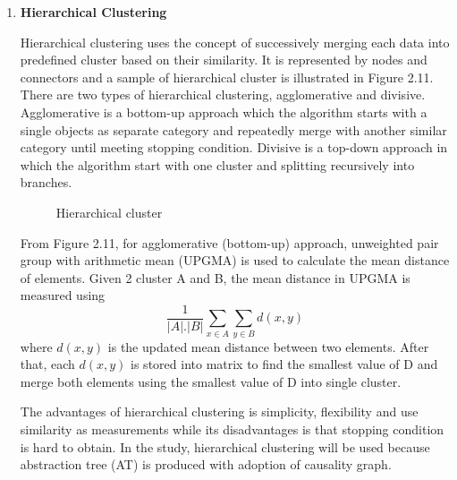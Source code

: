 \documentclass[twoside]{utmthesis}
\begin{document}
\begin{enumerate}
\item \textbf{Hierarchical Clustering}

Hierarchical clustering uses the concept of successively merging each data into predefined cluster based on their similarity. It is represented by nodes and connectors and a sample of hierarchical cluster is illustrated in Figure 2.11. There are two types of hierarchical clustering, agglomerative and divisive. Agglomerative is a bottom-up approach which the algorithm starts with a single objects as separate category and repeatedly merge with another similar category until meeting stopping condition. Divisive is a top-down approach in which the algorithm start with one cluster and splitting recursively into branches.  
\vspace{-1cm}
\begin{figure}[H]
\centering
{}
\caption{Hierarchical cluster \citep{suyal2014text}}
\end{figure}
\vspace{-1cm}
From Figure 2.11, for agglomerative (bottom-up) approach, unweighted pair group with arithmetic mean (UPGMA) is used to calculate the mean distance of elements. Given 2 cluster A and B, the mean distance in UPGMA is measured using 
\begin{equation}\label{2.2}
 \frac{1}{|A| . |B|} \sum_{x\in A}^{}\sum_{y\in B}^{}d(x,y)
\end{equation}
where $d(x,y)$ is the updated mean distance between two elements. After that, each $d(x,y)$ is stored into matrix to find the smallest value of D and merge both elements using the smallest value of D into single cluster. 

The advantages of hierarchical clustering is simplicity, flexibility and use similarity as measurements while its disadvantages is that stopping condition is hard to obtain. In the study, hierarchical clustering will be used because abstraction tree (AT) is produced with adoption of causality graph. 


\end{enumerate}
\end{document}
